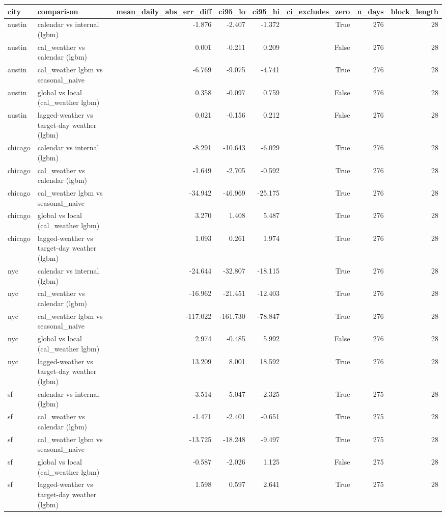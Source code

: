 \begin{tabular}{llrrrrrr}
\toprule
city & comparison & mean\_daily\_abs\_err\_diff & ci95\_lo & ci95\_hi & ci\_excludes\_zero & n\_days & block\_length \\
\midrule
austin & calendar vs internal (lgbm) & -1.876 & -2.407 & -1.372 & True & 276 & 28 \\
austin & cal\_weather vs calendar (lgbm) & 0.001 & -0.211 & 0.209 & False & 276 & 28 \\
austin & cal\_weather lgbm vs seasonal\_naive & -6.769 & -9.075 & -4.741 & True & 276 & 28 \\
austin & global vs local (cal\_weather lgbm) & 0.358 & -0.097 & 0.759 & False & 276 & 28 \\
austin & lagged-weather vs target-day weather (lgbm) & 0.021 & -0.156 & 0.212 & False & 276 & 28 \\
chicago & calendar vs internal (lgbm) & -8.291 & -10.643 & -6.029 & True & 276 & 28 \\
chicago & cal\_weather vs calendar (lgbm) & -1.649 & -2.705 & -0.592 & True & 276 & 28 \\
chicago & cal\_weather lgbm vs seasonal\_naive & -34.942 & -46.969 & -25.175 & True & 276 & 28 \\
chicago & global vs local (cal\_weather lgbm) & 3.270 & 1.408 & 5.487 & True & 276 & 28 \\
chicago & lagged-weather vs target-day weather (lgbm) & 1.093 & 0.261 & 1.974 & True & 276 & 28 \\
nyc & calendar vs internal (lgbm) & -24.644 & -32.807 & -18.115 & True & 276 & 28 \\
nyc & cal\_weather vs calendar (lgbm) & -16.962 & -21.451 & -12.403 & True & 276 & 28 \\
nyc & cal\_weather lgbm vs seasonal\_naive & -117.022 & -161.730 & -78.847 & True & 276 & 28 \\
nyc & global vs local (cal\_weather lgbm) & 2.974 & -0.485 & 5.992 & False & 276 & 28 \\
nyc & lagged-weather vs target-day weather (lgbm) & 13.209 & 8.001 & 18.592 & True & 276 & 28 \\
sf & calendar vs internal (lgbm) & -3.514 & -5.047 & -2.325 & True & 275 & 28 \\
sf & cal\_weather vs calendar (lgbm) & -1.471 & -2.401 & -0.651 & True & 275 & 28 \\
sf & cal\_weather lgbm vs seasonal\_naive & -13.725 & -18.248 & -9.497 & True & 275 & 28 \\
sf & global vs local (cal\_weather lgbm) & -0.587 & -2.026 & 1.125 & False & 275 & 28 \\
sf & lagged-weather vs target-day weather (lgbm) & 1.598 & 0.597 & 2.641 & True & 275 & 28 \\
\bottomrule
\end{tabular}
